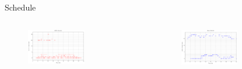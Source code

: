 \documentclass[aspectratio=169]{beamer}
\begin{document}
\begin{frame}[label={sec:orgf9d559f}]{Schedule}
\begin{columns}
\begin{column}{0.5\columnwidth}
\begin{figure}[htpb]
\centering
    \includegraphics[width=0.6\textwidth]{img/sa-pap-paper-bad/schedule-milp}
\end{figure}
\end{column}
\begin{column}{0.5\columnwidth}
\begin{figure}[htpb]
\centering
    \includegraphics[width=0.6\textwidth]{img/sa-pap-paper-bad/schedule-quinn}
\end{figure}
\end{column}
\end{columns}
\end{frame}
\end{document}
